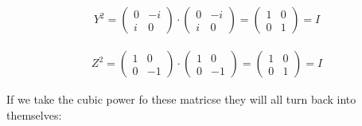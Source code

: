 \documentclass[11pt]{article}
\begin{document}
\begin{enumerate}
\begin{enumerate}
		            \begin{align*}
			            Y^2 =
			            \begin{pmatrix} 0 & -i \\ i & 0 \end{pmatrix}
			            \cdot
			            \begin{pmatrix} 0 & -i \\ i & 0 \end{pmatrix}
			            =
			            \begin{pmatrix} 1 & 0 \\ 0 & 1 \end{pmatrix}
			            = I
		            \end{align*}

		            \begin{align*}
			            Z^2 =
			            \begin{pmatrix} 1 & 0 \\ 0 & -1 \end{pmatrix}
			            \cdot
			            \begin{pmatrix} 1 & 0 \\ 0 & -1 \end{pmatrix}
			            =
			            \begin{pmatrix} 1 & 0 \\ 0 & 1 \end{pmatrix}
			            = I
		            \end{align*}

		            If we take the cubic power fo these matricse they will all turn back into themselves:


\end{enumerate}
\end{enumerate}
\end{document}
